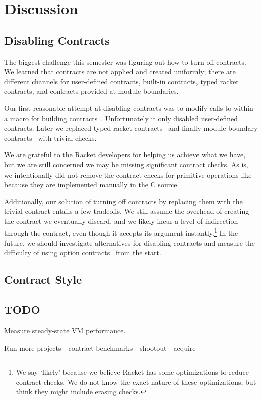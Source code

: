 \newpage
\section{Discussion}
\label{discussion}

\subsection{Disabling Contracts}
\label{disabling-contracts}

The biggest challenge this semester was figuring out how to turn off contracts.
We learned that contracts are not applied and created uniformly; there are different channels for user-defined contracts, built-in contracts, typed racket contracts, and contracts provided at module boundaries.

Our first reasonable attempt at disabling contracts was to modify calls to  within a macro for building contracts~\cite{no-contracts1}.
Unfortunately it only disabled user-defined contracts.
Later we replaced typed racket contracts~\cite{no-contracts2} and finally module-boundary contracts~\cite{no-contracts3} with trivial checks.

We are grateful to the Racket developers for helping us achieve what we have, but we are still concerned we may be missing significant contract checks.
As is, we intentionally did not remove the contract checks for primitive operations like \mono{+} because they are implemented manually in the C source.

Additionally, our solution of turning off contracts by replacing them with the trivial  contract entails a few tradeoffs.
We still assume the overhead of creating the contract we eventually discard, and we likely incur a level of indirection through the  contract, even though it accepts its argument instantly.\footnote{We say `likely' because we believe Racket has some optimizations to reduce contract checks. We do not know the exact nature of these optimizations, but think they might include erasing  checks.}
In the future, we should investigate alternatives for disabling contracts and measure the difficulty of using option contracts~\cite{option-contracts} from the start.

\subsection{Contract Style}


\subsection{TODO}

Measure steady-state VM performance.

Run more projects
- contract-benchmarks
- shootout
- acquire